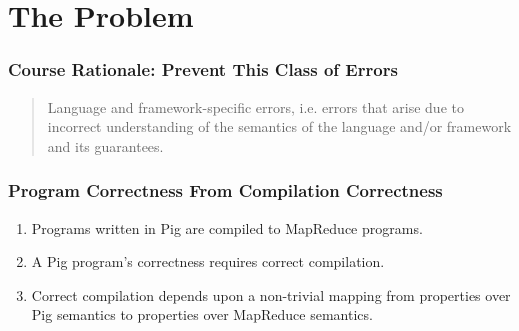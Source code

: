\section{The Problem}

\begin{frame}
  \frametitle{Course Rationale: Prevent This Class of Errors}
  \begin{quote}
      Language and framework-specific errors, i.e. errors that arise due to
      incorrect understanding of the semantics of the language and/or framework
      and its guarantees.
  \end{quote}
\end{frame}

\begin{frame}
  \frametitle{Program Correctness From Compilation Correctness}
  \begin{enumerate}
    \item Programs written in Pig are compiled to MapReduce programs.
    \item A Pig program's correctness requires correct compilation.
    \item Correct compilation depends upon a non-trivial mapping from
      properties over Pig semantics to properties over MapReduce semantics.
  \end{enumerate}

\end{frame}
